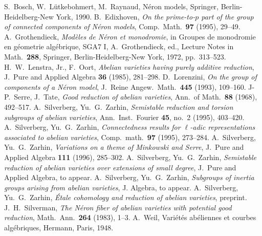 \documentclass{amsart}
\theoremstyle{definition}
\begin{document}
\begin{thebibliography}{99}

 S.\ Bosch, W.\ L\"utkebohmert, M.\ Raynaud, N\'eron models,
Springer, Berlin-Heidelberg-New York, 1990.
 B.\ Edixhoven, {\em On the prime-to-$p$ part of the
group of connected components of N\'eron models}, Comp.\ Math.\ {\bf 97} 
(1995), 29--49.
 A.\ Grothendieck, {\em Mod\`eles de N\'eron et monodromie},
in Groupes de monodromie en g\'eometrie alg\'ebrique, SGA7 I,
A.\ Gro\-then\-dieck, ed., Lecture Notes in Math.\ {\bf 288}, Springer,
Berlin-Heidelberg-New York, 1972, pp.\ 313--523.
 H.\ W.\  Lenstra, Jr., F.\ Oort, {\em Abelian varieties
having purely additive reduction}, J.\ Pure and Applied Algebra {\bf 36}
(1985), 281--298.
 D.\ Lorenzini, {\em On the group of components of a
N\'eron model}, J.\ Reine Angew.\ Math.\ {\bf 445} (1993), 109--160.
 J-P.\ Serre, J.\ Tate, {\em Good reduction of 
abelian varieties}, Ann.\ of Math.\ {\bf 88} (1968), 492--517. 
 A.\ Silverberg, Yu.\ G.\ Zarhin, {\em Semistable reduction 
and torsion subgroups of abelian varieties}, 
Ann.\ Inst.\ Fourier {\bf 45}, no.~2 (1995), 403--420.
 A.\ Silverberg, Yu.\ G.\ Zarhin,
{\em Connectedness results for $\ell$-adic 
representations associated to abelian varieties}, 
Comp.\ math.\ {\bf 97} (1995), 273--284.
 A.\ Silverberg, Yu.\ G.\ Zarhin, {\em Variations on a 
theme of Minkowski and Serre}, 
J.\ Pure and Applied Algebra
{\bf 111}  (1996),  285--302.
 A.\ Silverberg, Yu.\ G.\ Zarhin, 
{\em Semistable reduction of abelian varieties over extensions of small degree},
J.\ Pure and Applied Algebra, to appear.
 A.\ Silverberg, Yu.\ G.\ Zarhin, {\em Subgroups of inertia
groups arising from abelian varieties}, J. Algebra, to appear.
 A.\ Silverberg, Yu.\ G.\ Zarhin, 
{\em \'Etale cohomology and reduction of abelian varieties}, preprint.
 J.\ H.\ Silverman, {\em The N\'eron fiber of
abelian varieties with potential good reduction}, Math.\ Ann.\ {\bf 264}
(1983), 1--3.
 A.\ Weil, Vari\'et\'es ab\'eliennes et courbes 
alg\'ebriques, Hermann, Paris, 1948.

\end{thebibliography}
\end{document}
